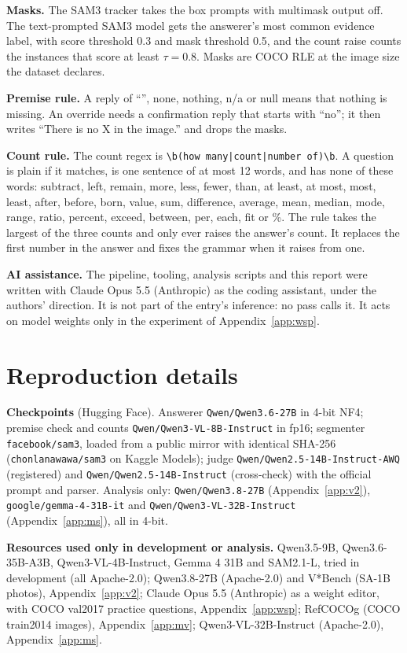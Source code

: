 \documentclass{article}
\begin{document}
\textbf{Masks.} The SAM3 tracker takes the box prompts with multimask output off. The text-prompted SAM3 model gets the answerer's
most common evidence label, with score threshold 0.3 and mask threshold 0.5, and the count raise counts the instances that score at
least $\tau=0.8$. Masks are COCO RLE at the image size the dataset declares.

\textbf{Premise rule.} A reply of ``'', none, nothing, n/a or null means that nothing is missing. An override needs a confirmation
reply that starts with ``no''; it then writes ``There is no X in the image.'' and drops the masks.

\textbf{Count rule.} The count regex is \texttt{\textbackslash b(how many|count|number of)\textbackslash b}. A question is plain if it
matches, is one sentence of at most 12 words, and has none of these words: subtract, left, remain, more, less, fewer, than, at least, at
most, most, least, after, before, born, value, sum, difference, average, mean, median, mode, range, ratio, percent, exceed, between,
per, each, fit or \%. The rule takes the largest of the three counts and only ever raises the answer's count. It replaces the first
number in the answer and fixes the grammar when it raises from one.

\textbf{AI assistance.} The pipeline, tooling, analysis scripts and this report were written with Claude Opus 5.5 (Anthropic) as the
coding assistant, under the authors' direction. It is not part of the entry's inference: no pass calls it. It acts on model weights
only in the experiment of Appendix~\ref{app:wsp}.

\section{Reproduction details}\label{app:repro}
\textbf{Checkpoints} (Hugging Face). Answerer \texttt{Qwen/Qwen3.6-27B} in 4-bit NF4; premise check and counts
\texttt{Qwen/Qwen3-VL-8B-Instruct} in fp16; segmenter \texttt{facebook/sam3}, loaded from a public mirror with identical
SHA-256 (\texttt{chonlanawawa/sam3} on Kaggle Models); judge \texttt{Qwen/Qwen2.5-14B-Instruct-AWQ} (registered) and
\texttt{Qwen/Qwen2.5-14B-Instruct} (cross-check) with the official prompt and parser. Analysis only: \texttt{Qwen/Qwen3.8-27B}
(Appendix~\ref{app:v2}), \texttt{google/gemma-4-31B-it} and \texttt{Qwen/Qwen3-VL-32B-Instruct} (Appendix~\ref{app:ms}), all in 4-bit.

\textbf{Resources used only in development or analysis.} Qwen3.5-9B, Qwen3.6-35B-A3B, Qwen3-VL-4B-Instruct, Gemma 4 31B and
SAM2.1-L, tried in development (all Apache-2.0); Qwen3.8-27B (Apache-2.0) and V*Bench (SA-1B photos), Appendix~\ref{app:v2};
Claude Opus 5.5 (Anthropic) as a weight editor, with COCO val2017 practice questions, Appendix~\ref{app:wsp}; RefCOCOg (COCO
train2014 images), Appendix~\ref{app:mv}; Qwen3-VL-32B-Instruct (Apache-2.0), Appendix~\ref{app:ms}.
\end{document}
